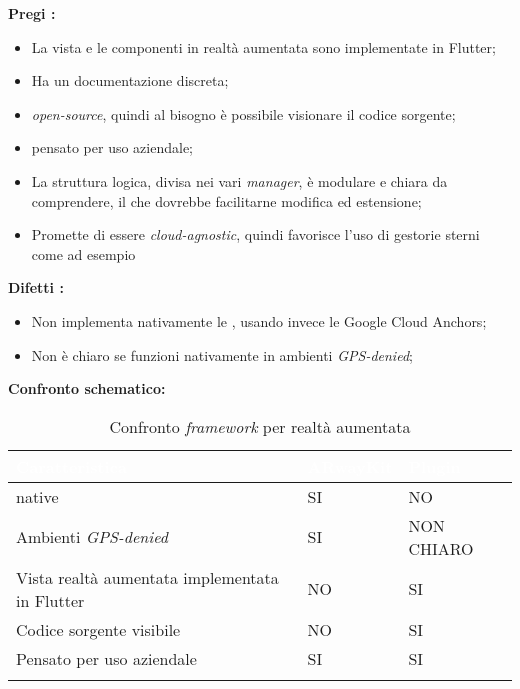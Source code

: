 \textbf{Pregi \aplug{}:}
\begin{itemize}
  \item La vista e le componenti in realtà aumentata sono implementate in Flutter;
  \item Ha un documentazione discreta;
  \item \e \textit{open-source}, quindi al bisogno è possibile visionare il codice sorgente;
  \item \e pensato per uso aziendale;
  \item La struttura logica, divisa nei vari \textit{manager}, è modulare e chiara da comprendere, il che dovrebbe facilitarne modifica ed estensione;
  \item Promette di essere \textit{cloud-agnostic}, quindi favorisce l'uso di gestorie sterni come ad esempio \asa{} 
\end{itemize}

\textbf{Difetti \aplug{}:}
\begin{itemize}
  \item Non implementa nativamente le \asa{}, usando invece le Google Cloud Anchors;
  \item Non è chiaro se funzioni nativamente in ambienti \textit{GPS-denied};
\end{itemize}

\textbf{Confronto schematico:}

{
  \setlength{\freewidth}{\dimexpr\textwidth-10\tabcolsep}
  \renewcommand{\arraystretch}{1.5}
  \centering
  \setlength{\aboverulesep}{0pt}
  \setlength{\belowrulesep}{0pt}
  \begin{longtable}{C{.6\freewidth} C{.2\freewidth} C{.2\freewidth}} 
     \toprule 
  \textcolor{white}{\textbf{Caratteristica}} &
  \textcolor{white}{\textbf{ARwayKit}} &
  \textcolor{white}{\textbf{Plugin}}\\
  \midrule
  \endhead
  
  \asa{} native & SI & NO\\
  Ambienti \textit{GPS-denied} & SI & NON CHIARO\\
  Vista realtà aumentata implementata in Flutter & NO & SI\\
  Codice sorgente visibile & NO & SI\\
  Pensato per uso aziendale & SI & SI\\

  \bottomrule
  \caption{Confronto \textit{framework} per realtà aumentata}
  \end{longtable}
}

